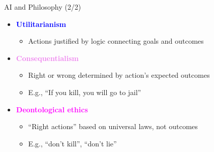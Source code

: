 \documentclass[
  10pt,
  ignorenonframetext,
]{beamer}
\providecommand{\tightlist}{%
  \setlength{\itemsep}{0pt}\setlength{\parskip}{0pt}}
\begin{document}
\begin{frame}{AI and Philosophy (2/2)}
\begin{itemize}
  \begin{itemize}
  \tightlist
  \item
    \textbf{\textcolor{blue}{Utilitarianism}}

    \begin{itemize}
    \tightlist
    \item
      Actions justified by logic connecting goals and outcomes
    \end{itemize}
  \item
    \textbf{\textcolor{violet}{Consequentialism}}

    \begin{itemize}
    \tightlist
    \item
      Right or wrong determined by action's expected outcomes
    \item
      E.g., ``If you kill, you will go to jail''
    \end{itemize}
  \item
    \textbf{\textcolor{magenta}{Deontological ethics}}

    \begin{itemize}
    \tightlist
    \item
      ``Right actions'' based on universal laws, not outcomes
    \item
      E.g., ``don't kill'', ``don't lie''
    \end{itemize}
  \end{itemize}
\end{itemize}
\end{frame}
\end{document}
